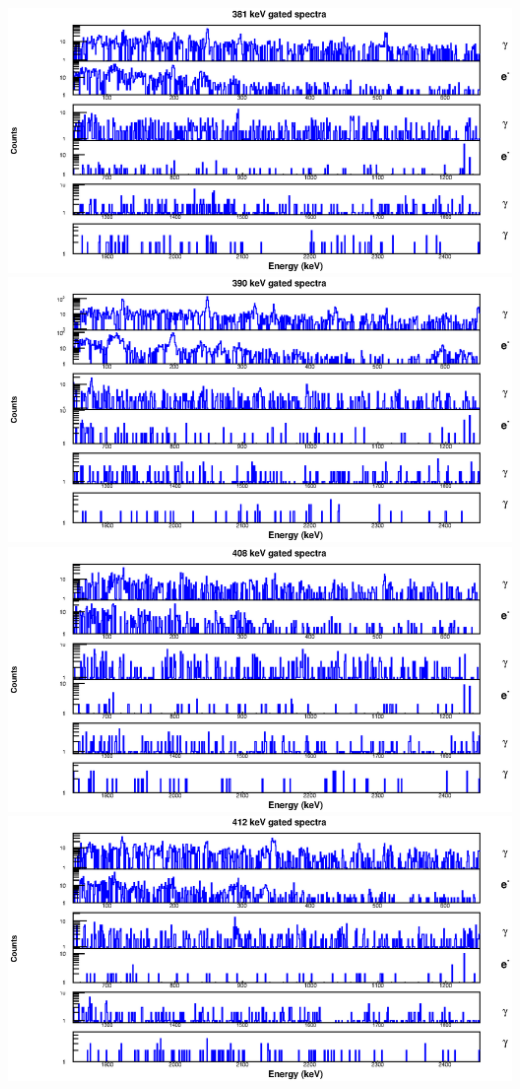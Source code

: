 \begin{landscape}
\includegraphics[scale=1.2]{154Gd_Appendix/381_combined.eps}
\includegraphics[scale=1.2]{154Gd_Appendix/390_combined.eps}
\includegraphics[scale=1.2]{154Gd_Appendix/408_combined.eps}
\includegraphics[scale=1.2]{154Gd_Appendix/412_combined.eps}

\end{landscape}
